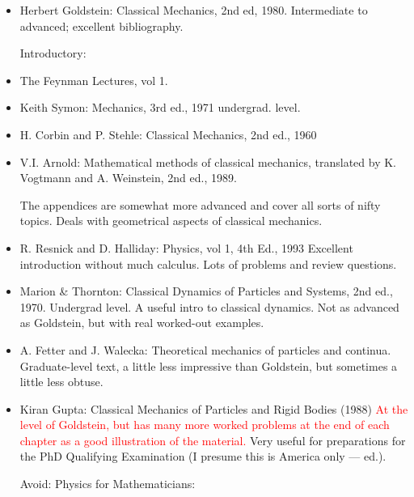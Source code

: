 \documentclass[10pt,a4paper]{book}
\theoremstyle{definition}
\begin{document}
\begin{itemize}
\item Herbert Goldstein: Classical Mechanics, 2nd ed, 1980.
Intermediate to advanced; excellent bibliography.

Introductory: 

\item The Feynman Lectures, vol 1.
\item Keith Symon: Mechanics, 3rd ed., 1971 undergrad. level.
\item H. Corbin and P. Stehle: Classical Mechanics, 2nd ed., 1960
\item V.I. Arnold: Mathematical methods of classical mechanics, translated by K. Vogtmann and A. Weinstein, 2nd ed., 1989.

The appendices are somewhat more advanced and cover all sorts of nifty topics.  Deals with geometrical aspects of classical mechanics.

\item R. Resnick and D. Halliday: Physics, vol 1, 4th Ed., 1993
Excellent introduction without much calculus.  Lots of problems and review questions.

\item Marion \& Thornton: Classical Dynamics of Particles and Systems, 2nd ed., 1970.
Undergrad level.  A useful intro to classical dynamics.  Not as advanced as Goldstein, but with real worked-out examples.

\item A. Fetter and J. Walecka: Theoretical mechanics of particles and continua. Graduate-level text, a little less impressive than Goldstein, but sometimes a little less obtuse.

\item Kiran Gupta: Classical Mechanics of Particles and Rigid Bodies (1988)
\textcolor{red}{At the level of Goldstein, but has many more worked problems at the end of each chapter as a good illustration of the material.}  Very useful for preparations for the PhD Qualifying Examination (I presume this is America only — ed.).

Avoid: Physics for Mathematicians: 


\end{itemize}
\end{document}
